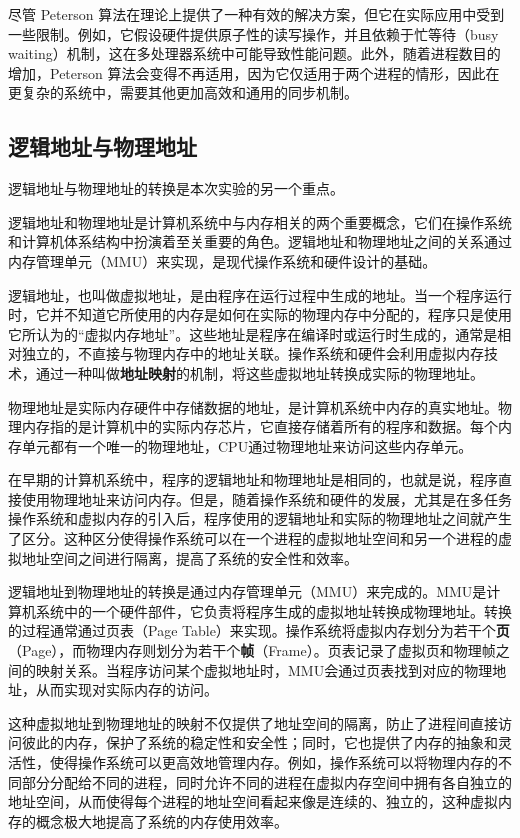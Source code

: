 尽管 Peterson 算法在理论上提供了一种有效的解决方案，但它在实际应用中受到一些限制。例如，它假设硬件提供原子性的读写操作，并且依赖于忙等待（busy waiting）机制，这在多处理器系统中可能导致性能问题。此外，随着进程数目的增加，Peterson 算法会变得不再适用，因为它仅适用于两个进程的情形，因此在更复杂的系统中，需要其他更加高效和通用的同步机制。

\subsection{逻辑地址与物理地址}

逻辑地址与物理地址的转换是本次实验的另一个重点。

逻辑地址和物理地址是计算机系统中与内存相关的两个重要概念，它们在操作系统和计算机体系结构中扮演着至关重要的角色。逻辑地址和物理地址之间的关系通过内存管理单元（MMU）来实现，是现代操作系统和硬件设计的基础。

逻辑地址，也叫做虚拟地址，是由程序在运行过程中生成的地址。当一个程序运行时，它并不知道它所使用的内存是如何在实际的物理内存中分配的，程序只是使用它所认为的“虚拟内存地址”。这些地址是程序在编译时或运行时生成的，通常是相对独立的，不直接与物理内存中的地址关联。操作系统和硬件会利用虚拟内存技术，通过一种叫做\textbf{地址映射}的机制，将这些虚拟地址转换成实际的物理地址。

物理地址是实际内存硬件中存储数据的地址，是计算机系统中内存的真实地址。物理内存指的是计算机中的实际内存芯片，它直接存储着所有的程序和数据。每个内存单元都有一个唯一的物理地址，CPU通过物理地址来访问这些内存单元。

在早期的计算机系统中，程序的逻辑地址和物理地址是相同的，也就是说，程序直接使用物理地址来访问内存。但是，随着操作系统和硬件的发展，尤其是在多任务操作系统和虚拟内存的引入后，程序使用的逻辑地址和实际的物理地址之间就产生了区分。这种区分使得操作系统可以在一个进程的虚拟地址空间和另一个进程的虚拟地址空间之间进行隔离，提高了系统的安全性和效率。

逻辑地址到物理地址的转换是通过内存管理单元（MMU）来完成的。MMU是计算机系统中的一个硬件部件，它负责将程序生成的虚拟地址转换成物理地址。转换的过程通常通过页表（Page Table）来实现。操作系统将虚拟内存划分为若干个\textbf{页}（Page），而物理内存则划分为若干个\textbf{帧}（Frame）。页表记录了虚拟页和物理帧之间的映射关系。当程序访问某个虚拟地址时，MMU会通过页表找到对应的物理地址，从而实现对实际内存的访问。

这种虚拟地址到物理地址的映射不仅提供了地址空间的隔离，防止了进程间直接访问彼此的内存，保护了系统的稳定性和安全性；同时，它也提供了内存的抽象和灵活性，使得操作系统可以更高效地管理内存。例如，操作系统可以将物理内存的不同部分分配给不同的进程，同时允许不同的进程在虚拟内存空间中拥有各自独立的地址空间，从而使得每个进程的地址空间看起来像是连续的、独立的，这种虚拟内存的概念极大地提高了系统的内存使用效率。

